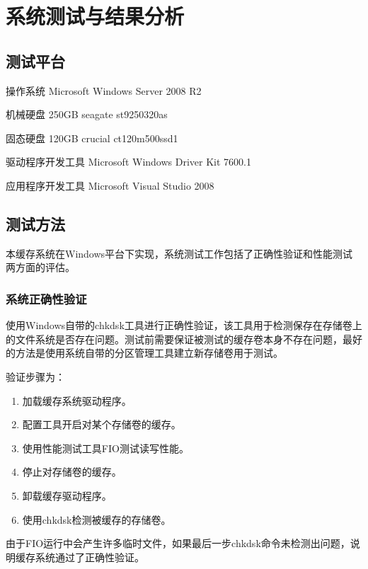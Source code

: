 
\chapter{系统测试与结果分析}
\label{cha:exp_analysis}

\section{测试平台}
\label{sec:exp_platform}

操作系统 Microsoft Windows Server 2008 R2

机械硬盘 250GB seagate st9250320as

固态硬盘 120GB crucial ct120m500ssd1

驱动程序开发工具 Microsoft Windows Driver Kit 7600.1

应用程序开发工具 Microsoft Visual Studio 2008

\section{测试方法}
\label{sec:exp_method}

本缓存系统在Windows平台下实现，系统测试工作包括了正确性验证和性能测试两方面的评估。

\subsection{系统正确性验证}

使用Windows自带的chkdsk工具进行正确性验证，该工具用于检测保存在存储卷上的文件系统是否存在问题。测试前需要保证被测试的缓存卷本身不存在问题，最好的方法是使用系统自带的分区管理工具建立新存储卷用于测试。

验证步骤为：
\begin{enumerate}
\item 加载缓存系统驱动程序。
\item 配置工具开启对某个存储卷的缓存。
\item 使用性能测试工具FIO测试读写性能。
\item 停止对存储卷的缓存。
\item 卸载缓存驱动程序。
\item 使用chkdsk检测被缓存的存储卷。
\end{enumerate}

由于FIO运行中会产生许多临时文件，如果最后一步chkdsk命令未检测出问题，说明缓存系统通过了正确性验证。

